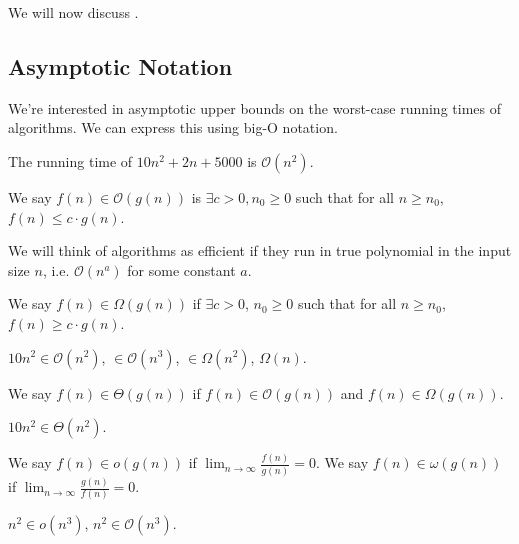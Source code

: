 \documentclass[12pt]{scrartcl}
\begin{document}
We will now discuss .

\subsection{Asymptotic Notation}
We're interested in asymptotic upper bounds on the worst-case running times of algorithms. We can express this using big-O notation.

\begin{example}
    The running time of $10n^2 + 2n + 5000$ is $\mathcal{O}(n^2)$.
\end{example}

\begin{definition}
    We say $f(n) \in \mathcal{O}(g(n))$ is $\exists c > 0, n_0 \geq 0$ such that for all $n \geq n_0$, $f(n) \leq c \cdot g(n)$.
\end{definition}

We will think of algorithms as efficient if they run in true polynomial in the input size $n$, i.e. $\mathcal{O}(n^a)$ for some constant $a$.

\begin{definition}
    We say $f(n) \in \Omega(g(n))$ if $\exists c > 0$, $n_0 \geq 0$ such that for all $n \geq n_0$, $f(n) \geq c \cdot g(n)$.
\end{definition}

\begin{example}
    $10n^2 \in \mathcal{O}(n^2)$, $\in \mathcal{O}(n^3)$, $\in \Omega(n^2)$, $\Omega(n)$.
\end{example}

\begin{definition}
    We say $f(n) \in \Theta(g(n))$ if $f(n) \in \mathcal{O}(g(n))$ and $f(n) \in \Omega(g(n))$.
\end{definition}

\begin{example}
    $10n^2 \in \Theta(n^2)$.
\end{example}

\begin{definition}
    We say $f(n) \in o(g(n))$ if $\lim_{n \to \infty} \frac{f(n)}{g(n)} = 0$. We say $f(n) \in \omega(g(n))$ if $\lim_{n \to \infty} \frac{g(n)}{f(n)} = 0$.
\end{definition}

\begin{example}
    $n^2 \in o(n^3)$, $n^2 \in \mathcal{O}(n^3)$.
\end{example}
\end{document}
